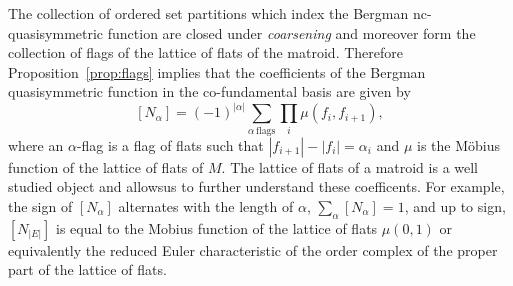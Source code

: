 \documentclass[12pt,reqno]{amsart}
\numberwithin{definition}{section}
\newtheorem{proposition}[definition]{Proposition}
\newtheorem{theorem}[definition]{Theorem}
\theoremstyle{definition}
\newcommand{\om}{\omega}
\begin{document}




The collection of ordered set partitions which index the Bergman
nc-quasisymmetric function are closed under {\em coarsening} and moreover form the collection of flags of the lattice of flats of the matroid. Therefore Proposition~\ref{prop:flags} implies that the coefficients of the Bergman quasisymmetric function in the co-fundamental basis are given by
$$[N_{\alpha}] = (-1)^{|\alpha|} \sum_{\alpha \, \textrm{flags}} \prod_i \mu(f_i,f_{i+1}),$$
where an $\alpha$-flag is a flag of flats such that $|f_{i+1}| - |f_i| = \alpha_i$ and $\mu$ is the M\"{o}bius function of the lattice of flats of $M$.  The lattice of flats of a matroid is a well studied object and allowsus to further understand these coefficents.  For example, the sign of $[N_{\alpha}]$ alternates with the length of $\alpha$,  $\sum_{\alpha} [N_{\alpha}] = 1$, and up to sign, $ [N_{|E|}]$ is equal to the Mobius function of the lattice
of flats $\mu(0,1)$ or equivalently the reduced Euler characteristic of the order complex of the
proper part of the lattice of flats.


\end{document}
